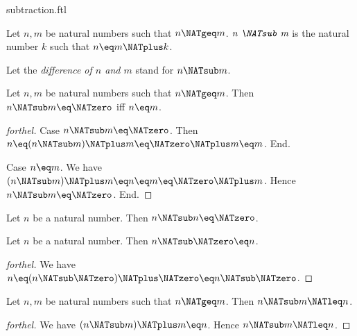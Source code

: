 \documentclass{naproche-library}
\begin{document}
\begin{smodule}[title=Subtraction]{subtraction.ftl}

\begin{definition}[forthel,id=ARITHMETIC_05_8878757276286976]
  Let $n, m$ be natural numbers such that $n \NATgeq m$.
  $\emph{n \NATsub m}$ is the natural number $k$ such that $n \eq m \NATplus k$.

  Let the \emph{difference of $n$ and $m$} stand for $n \NATsub m$.
\end{definition}

\begin{proposition}[forthel,id=ARITHMETIC_05_874271710642176]
  Let $n, m$ be natural numbers such that $n \NATgeq m$.
  Then $n \NATsub m \eq \NATzero$ iff $n \eq m$.
\end{proposition}
\begin{proof}[forthel]
  Case $n \NATsub m \eq \NATzero$.
    Then $n
      \eq (n \NATsub m) \NATplus m
      \eq \NATzero \NATplus m
      \eq m$.
  End.

  Case $n \eq m$.
    We have $(n \NATsub m) \NATplus m
      \eq n
      \eq m
      \eq \NATzero \NATplus m$.
    Hence $n \NATsub m \eq \NATzero$.
  End.
\end{proof}

\begin{corollary}[forthel,id=ARITHMETIC_05_8457713057005568]
  Let $n$ be a natural number.
  Then $n \NATsub n \eq \NATzero$.
\end{corollary}

\begin{proposition}[forthel,id=ARITHMETIC_05_8518521570983936]
  Let $n$ be a natural number.
  Then $n \NATsub \NATzero \eq n$.
\end{proposition}
\begin{proof}[forthel]
  We have $n
    \eq (n \NATsub \NATzero) \NATplus \NATzero
    \eq n \NATsub \NATzero$.
\end{proof}

\begin{proposition}[forthel,id=ARITHMETIC_05_4222566117933056]
  Let $n, m$ be natural numbers such that $n \NATgeq m$.
  Then $n \NATsub m \NATleq n$.
\end{proposition}
\begin{proof}[forthel]
  We have $(n \NATsub m) \NATplus m \eq n$.
  Hence $n \NATsub m \NATleq n$.
\end{proof}


\end{smodule}
\end{document}
